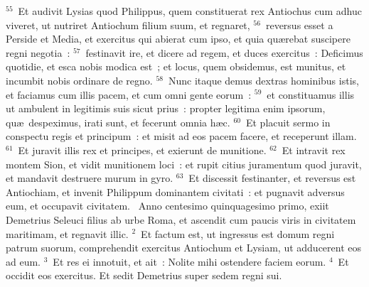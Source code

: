 ${}^{55}$~Et audivit Lysias quod Philippus, quem constituerat rex Antiochus cum adhuc viveret, ut nutriret Antiochum filium suum, et regnaret,
${}^{56}$~reversus esset a Perside et Media, et exercitus qui abierat cum ipso, et quia qu\ae rebat suscipere regni negotia~:
${}^{57}$~festinavit ire, et dicere ad regem, et duces exercitus~: Deficimus quotidie, et esca nobis modica est~; et locus, quem obsidemus, est munitus, et incumbit nobis ordinare de regno.
${}^{58}$~Nunc itaque demus dextras hominibus istis, et faciamus cum illis pacem, et cum omni gente eorum~:
${}^{59}$~et constituamus illis ut ambulent in legitimis suis sicut prius~: propter legitima enim ipsorum, qu\ae\ despeximus, irati sunt, et fecerunt omnia h\ae c.
${}^{60}$~Et placuit sermo in conspectu regis et principum~: et misit ad eos pacem facere, et receperunt illam.
${}^{61}$~Et juravit illis rex et principes, et exierunt de munitione.
${}^{62}$~Et intravit rex montem Sion, et vidit munitionem loci~: et rupit citius juramentum quod juravit, et mandavit destruere murum in gyro.
${}^{63}$~Et discessit festinanter, et reversus est Antiochiam, et invenit Philippum dominantem civitati~: et pugnavit adversus eum, et occupavit civitatem.
~Anno centesimo quinquagesimo primo, exiit Demetrius Seleuci filius ab urbe Roma, et ascendit cum paucis viris in civitatem maritimam, et regnavit illic.
${}^{2}$~Et factum est, ut ingressus est domum regni patrum suorum, comprehendit exercitus Antiochum et Lysiam, ut adducerent eos ad eum.
${}^{3}$~Et res ei innotuit, et ait~: Nolite mihi ostendere faciem eorum.
${}^{4}$~Et occidit eos exercitus. Et sedit Demetrius super sedem regni sui.


